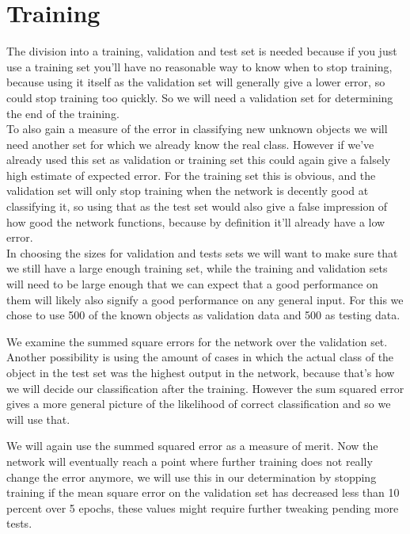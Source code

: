 \section{Training}
\begin{description}[style=unboxed]
    \item[How and why did you divide your data into a training, validation and test set?]
    The division into a training, validation and test set is needed because if you just use a training set you'll have no reasonable way to know when to stop training, because using it itself as the validation set will generally give a lower error, so could stop training too quickly. So we will need a validation set for determining the end of the training.\\
    To also gain a measure of the error in classifying new unknown objects we will need another set for which we already know the real class. However if we've already used this set as validation or training set this could again give a falsely high estimate of expected error. For the training set this is obvious, and the validation set will only stop training when the network is decently good at classifying it, so using that as the test set would also give a false impression of how good the network functions, because by definition it'll already have a low error.\\ 
    In choosing the sizes for validation and tests sets we will want to make sure that we still have a large enough training set, while the training and validation sets will need to be large enough that we can expect that a good performance on them will likely also signify a good performance on any general input. For this we chose to use 500 of the known objects as validation data and 500 as testing data.
    \item[How do you evaluate the performance of your network?]
    We examine the summed square errors for the network over the validation set. Another possibility is using the amount of cases in which the actual class of the object in the test set was the highest output in the network, because that's how we will decide our classification after the training. However the sum squared error gives a more general picture of the likelihood of correct classification and so we will use that.
    \item[When and why do you decide to end the training?]
    We will again use the summed squared error as a measure of merit. Now the network will eventually reach a point where further training does not really change the error anymore, we will use this in our determination by stopping training if the mean square error on the validation set has decreased less than 10 percent over 5 epochs, these values might require further tweaking pending more tests.

\end{description}
